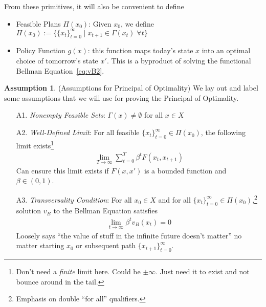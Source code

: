 \documentclass[12pt]{article}
\numberwithin{equation}{section} %
\theoremstyle{plain}
\theoremstyle{definition}
\newtheorem{assump}[thm]{Assumption}
\theoremstyle{remark}
\newcommand{\tinfz}{_{t=0}^\infty}
\begin{document}
From these primitives, it will also be convenient to define
\begin{itemize}

  \item Feasible Plans $\Pi(x_0)$:
    Given $x_0$,
    we define
    $\Pi(x_0) :=
    \big\{ \{x_t\}\tinfz \;|\; x_{t+1} \in \Gamma(x_t) \; \forall t\big\}$

  \item Policy Function $g(x)$: this function maps today's state $x$
    into an optimal choice of tomorrow's state $x'$. This is a byproduct
    of solving the functional Bellman Equation~\ref{eq:vB2}.
\end{itemize}

\clearpage
\begin{assump}(Assumptions for Principal of Optimality)
We lay out and label some assumptions that we will use for proving the
Principal of Optimality.
\begin{enumerate}
  \item[A1.] \emph{Nonempty Feasible Sets}:
    $\Gamma(x)\neq\emptyset$ for all $x\in X$

  \item[A2.] \emph{Well-Defined Limit}:
    For all feasible $\{x_{t}\}_{t=0}^\infty \in \Pi(x_0)$,
    the following limit exists\footnote{%
      Don't need a \emph{finite} limit here. Could be $\pm \infty$. Just
      need it to exist and not bounce around in the tail.
    }
    \begin{align*}
      \lim_{T\rightarrow\infty} \sum_{t=0}^T \beta^t F(x_t,x_{t+1})
    \end{align*}
    Can ensure this limit exists if $F(x,x')$ is a bounded function and
    $\beta \in (0,1)$.

  \item[A3.] \emph{Transversality Condition}:
    For all $x_0\in X$ and for all
    $\{x_{t}\}_{t=0}^\infty \in \Pi(x_0)$,\footnote{%
      Emphasis on double ``for all'' qualifiers.
    }
    solution $v_B$ to the Bellman Equation satisfies
    \begin{align*}
      \lim_{t\rightarrow\infty} \beta^t v_B(x_t) = 0
    \end{align*}
    Loosely says ``the value of stuff in the infinite future doesn't
    matter'' no matter starting $x_0$ or subsequent path
    $\{x_{t+1}\}_{t=0}^\infty$.
\end{enumerate}
\end{assump}
\end{document}
